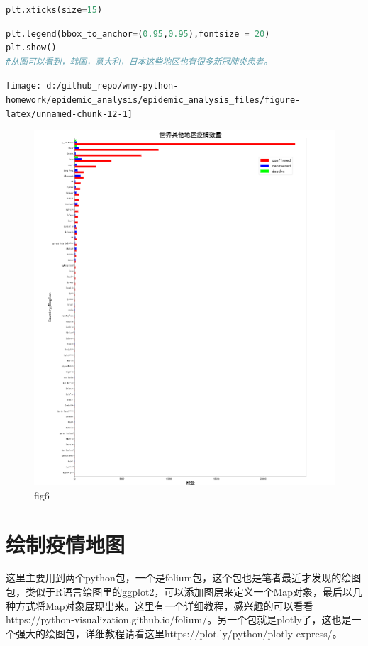 \documentclass[UTF8,a4paper,12pt]{ctexart}  %
\begin{document}
\begin{lstlisting}[language=Python]
plt.xticks(size=15)
\end{lstlisting}

\begin{lstlisting}[language=Python]
plt.legend(bbox_to_anchor=(0.95,0.95),fontsize = 20)
plt.show()
#从图可以看到，韩国，意大利，日本这些地区也有很多新冠肺炎患者。
\end{lstlisting}

\begin{center}\texttt{[image: d:/github\_repo/wmy-python-homework/epidemic\_analysis/epidemic\_analysis\_files/figure-latex/unnamed-chunk-12-1]} \end{center}

\begin{figure}
\centering
\includegraphics{./fig6.png}
\caption{fig6}
\end{figure}

\section{绘制疫情地图}

这里主要用到两个python包，一个是folium包，这个包也是笔者最近才发现的绘图包，类似于R语言绘图里的ggplot2，可以添加图层来定义一个Map对象，最后以几种方式将Map对象展现出来。这里有一个详细教程，感兴趣的可以看看https://python-visualization.github.io/folium/。另一个包就是plotly了，这也是一个强大的绘图包，详细教程请看这里https://plot.ly/python/plotly-express/。
\end{document}
